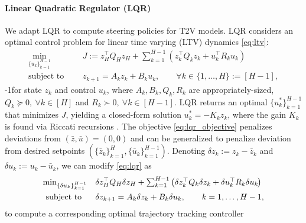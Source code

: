 \documentclass{article}
\begin{document}
\vspace{-8pt}
\paragraph{Linear Quadratic Regulator (LQR)}\label{sec:prelim_lqr}

We adapt LQR \cite{kalman1960contributions} to compute steering policies for T2V models. LQR considers an optimal control problem for linear time varying (LTV) dynamics \eqref{eq:ltv}:
\begin{subequations}\label{eq:lqr}
\begin{align}
\textstyle\min_{\{u_k\}_{k=1}^{H-1}}\quad
& J := z_H^\top Q_H z_H
+ \textstyle \sum_{k=1}^{H-1} \left( z_k^\top Q_k z_k + u_k^\top R_k u_k \right)
\label{eq:lqr_objective} \\
\text{subject to} \quad\ \
& z_{k+1} = A_k z_k + B_k u_k, \qquad \forall k \in \{1,\dots,H\} := [H-1],
\label{eq:ltv}
\end{align}
\end{subequations}
\looseness-1for state $z_k$ and control $u_k$, where $A_k,B_k,Q_k,R_k$ are appropriately-sized, $Q_k \succeq 0,\ \forall k \in [H]$ and $R_k \succ 0,\ \forall k \in [H-1]$. LQR returns an optimal $\{u^*_k\}_{k=1}^{H-1}$ that minimizes $J$, yielding a closed-form solution $u^*_k = -K_kz_k$, where the gain $K_k$ is found via Riccati recursions 
\cite{lewisOptimalControlChapter2}. The objective \eqref{eq:lqr_objective} penalizes deviations from $(\bar z,\bar u) = (0,0)$ and can be generalized to penalize deviation from desired setpoints $(\{\bar z_k\}_{k=1}^H, \{\bar u_k\}_{k=1}^{H-1})$. Denoting $\delta z_k := z_k - \bar z_k$ and $\delta u_k := u_k - \bar u_k$, we can modify \eqref{eq:lqr} as
\begin{subequations}\label{eq:lqr_tracking}
\begin{align}
\textstyle\min_{\{\delta u_k\}_{k=1}^{H-1}}\quad
& \delta z_H^\top Q_H \delta z_H
+ \textstyle\sum_{k=1}^{H-1} \left( \delta z_k^\top Q_k \delta z_k + \delta u_k^\top R_k \delta u_k \hspace{-1pt}\right)
\label{eq:err_lqr_objective} \\
\text{subject to} \quad\ \
& \delta z_{k+1} = A_k \delta z_k + B_k \delta u_k, \qquad k = 1,\dots,H-1,
\label{eq:err_ltv}
\end{align}
\end{subequations}
to compute a corresponding optimal trajectory tracking controller 
\end{document}
